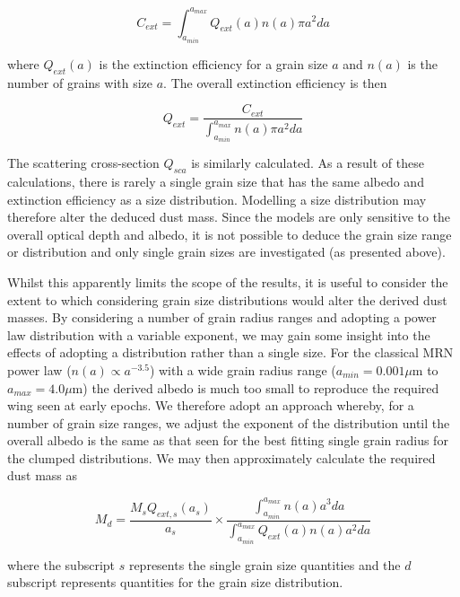 \documentclass[useAMS,usenatbib,usegraphicx]{mnras}
\begin{document}
\begin{equation}
 C_{ext}=\int^{a_{max}}_{a_{min}} Q_{ext}(a) n(a) \pi a^2 da 
 \end{equation}

where $Q_{ext}(a)$ is the extinction efficiency for a grain size $a$ and $n(a)$ is the number of grains with size $a$. The overall extinction efficiency is then

\begin{equation}
 Q_{ext} = \frac{C_{ext}}{ \int^{a_{max}}_{a_{min}} n(a) \pi a^2 da} 
 \end{equation}
 
 


 
The scattering cross-section $Q_{sca}$ is similarly calculated.  As a result of these calculations, there is rarely a single grain size that has the same albedo and extinction efficiency as a size distribution.  Modelling a size distribution may therefore alter the deduced dust mass.  Since the models are only sensitive to the overall optical depth and albedo, it is not possible to deduce the grain size range or distribution and only single grain sizes are investigated (as presented above).

Whilst this apparently limits the scope of the results, it is useful to consider the extent to which considering grain size distributions would alter the derived dust masses.  By considering a number of grain radius ranges and adopting a power law distribution with a variable exponent, we may gain some insight into the effects of adopting a distribution rather than a single size.  For the classical MRN power law ($n(a) \propto a^{-3.5}$) with a wide grain radius range ($a_{min} = 0.001 \mu$m to $a_{max} = 4.0 \mu$m) the derived albedo is much too small to reproduce the required wing seen at early epochs.  We therefore adopt an approach whereby, for a number of grain size ranges, we adjust the exponent of the distribution until the overall albedo is the same as that seen for the best fitting single grain radius for the clumped distributions.  We may then approximately calculate the required dust mass as

\begin{equation}
\label{distn_conv}
M_{d}= \frac{M_s Q_{ext,s}(a_s)}{a_s} \times \frac{\int^{a_{max}}_{a_{min}} n(a) a^3 da}{\int^{a_{max}}_{a_{min}} Q_{ext}(a) n(a) a^2 da}
\end{equation}

where the subscript $s$ represents the single grain size quantities and the $d$ subscript represents quantities for the grain size distribution.  
\end{document}
